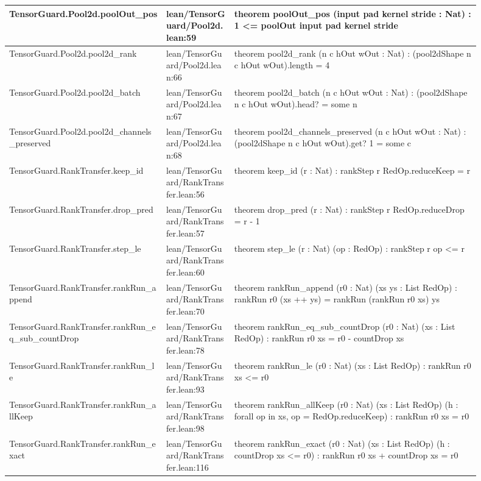 \documentclass[10pt]{article}
\begin{document}
\begin{longtable}{|p{0.30\linewidth}|p{0.13\linewidth}|p{0.47\linewidth}|}
\hline
TensorGuard.Pool2d.poolOut\_pos & lean/TensorGuard/Pool2d.lean:59 & theorem poolOut\_pos (input pad kernel stride : Nat) : 1 <= poolOut input pad kernel stride \\
\hline
TensorGuard.Pool2d.pool2d\_rank & lean/TensorGuard/Pool2d.lean:66 & theorem pool2d\_rank (n c hOut wOut : Nat) : (pool2dShape n c hOut wOut).length = 4 \\
\hline
TensorGuard.Pool2d.pool2d\_batch & lean/TensorGuard/Pool2d.lean:67 & theorem pool2d\_batch (n c hOut wOut : Nat) : (pool2dShape n c hOut wOut).head? = some n \\
\hline
TensorGuard.Pool2d.pool2d\_channels\_preserved & lean/TensorGuard/Pool2d.lean:68 & theorem pool2d\_channels\_preserved (n c hOut wOut : Nat) : (pool2dShape n c hOut wOut).get? 1 = some c \\
\hline
TensorGuard.RankTransfer.keep\_id & lean/TensorGuard/RankTransfer.lean:56 & theorem keep\_id (r : Nat) : rankStep r RedOp.reduceKeep = r \\
\hline
TensorGuard.RankTransfer.drop\_pred & lean/TensorGuard/RankTransfer.lean:57 & theorem drop\_pred (r : Nat) : rankStep r RedOp.reduceDrop = r - 1 \\
\hline
TensorGuard.RankTransfer.step\_le & lean/TensorGuard/RankTransfer.lean:60 & theorem step\_le (r : Nat) (op : RedOp) : rankStep r op <= r \\
\hline
TensorGuard.RankTransfer.rankRun\_append & lean/TensorGuard/RankTransfer.lean:70 & theorem rankRun\_append (r0 : Nat) (xs ys : List RedOp) : rankRun r0 (xs ++ ys) = rankRun (rankRun r0 xs) ys \\
\hline
TensorGuard.RankTransfer.rankRun\_eq\_sub\_countDrop & lean/TensorGuard/RankTransfer.lean:78 & theorem rankRun\_eq\_sub\_countDrop (r0 : Nat) (xs : List RedOp) : rankRun r0 xs = r0 - countDrop xs \\
\hline
TensorGuard.RankTransfer.rankRun\_le & lean/TensorGuard/RankTransfer.lean:93 & theorem rankRun\_le (r0 : Nat) (xs : List RedOp) : rankRun r0 xs <= r0 \\
\hline
TensorGuard.RankTransfer.rankRun\_allKeep & lean/TensorGuard/RankTransfer.lean:98 & theorem rankRun\_allKeep (r0 : Nat) (xs : List RedOp) (h : forall op in xs, op = RedOp.reduceKeep) : rankRun r0 xs = r0 \\
\hline
TensorGuard.RankTransfer.rankRun\_exact & lean/TensorGuard/RankTransfer.lean:116 & theorem rankRun\_exact (r0 : Nat) (xs : List RedOp) (h : countDrop xs <= r0) : rankRun r0 xs + countDrop xs = r0 \\

\end{longtable}
\end{document}
